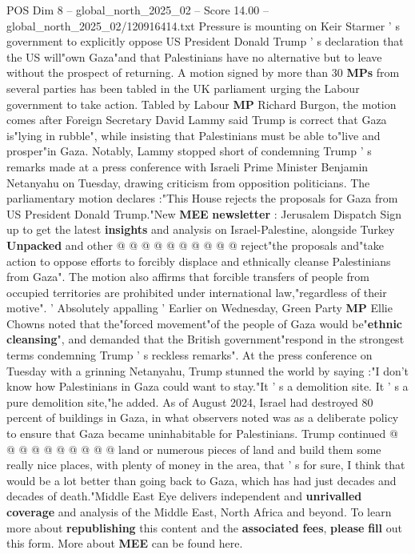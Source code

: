 \begin{textsample}{POS Dim 8 – global\_north\_2025\_02 – Score 14.00 – global\_north\_2025\_02/120916414.txt}  \label{ex:f8_pos_010}
Pressure is mounting on Keir Starmer ' s government to explicitly oppose US President Donald Trump ' s declaration that the US will"own Gaza"and that Palestinians have no alternative but to leave without the prospect of returning.
A motion signed by more than 30 \textbf{MPs} from several parties has been tabled in the UK parliament urging the Labour government to take action.
Tabled by Labour \textbf{MP} Richard Burgon, the motion comes after Foreign Secretary David Lammy said Trump is correct that Gaza is"lying in rubble", while insisting that Palestinians must be able to"live and prosper"in Gaza.
Notably, Lammy stopped short of condemning Trump ' s remarks made at a press conference with Israeli Prime Minister Benjamin Netanyahu on Tuesday, drawing criticism from opposition politicians.
The parliamentary motion declares :"This House rejects the proposals for Gaza from US President Donald Trump."New \textbf{MEE} \textbf{newsletter} : Jerusalem Dispatch Sign up to get the latest \textbf{insights} and analysis on Israel-Palestine, alongside Turkey \textbf{Unpacked} and other @ @ @ @ @ @ @ @ @ @ reject"the proposals and"take action to oppose efforts to forcibly displace and ethnically cleanse Palestinians from Gaza".
The motion also affirms that forcible transfers of people from occupied territories are prohibited under international law,"regardless of their motive". ' Absolutely appalling ' Earlier on Wednesday, Green Party \textbf{MP} Ellie Chowns noted that the"forced movement"of the people of Gaza would be"\textbf{ethnic} \textbf{cleansing}", and demanded that the British government"respond in the strongest terms condemning Trump ' s reckless remarks".
At the press conference on Tuesday with a grinning Netanyahu, Trump stunned the world by saying :"I don't know how Palestinians in Gaza could want to stay."It ' s a demolition site.
It ' s a pure demolition site,"he added.
As of August 2024, Israel had destroyed 80 percent of buildings in Gaza, in what observers noted was as a deliberate policy to ensure that Gaza became uninhabitable for Palestinians.
Trump continued @ @ @ @ @ @ @ @ @ @ land or numerous pieces of land and build them some really nice places, with plenty of money in the area, that ' s for sure, I think that would be a lot better than going back to Gaza, which has had just decades and decades of death."Middle East Eye delivers independent and \textbf{unrivalled} \textbf{coverage} and analysis of the Middle East, North Africa and beyond.
To learn more about \textbf{republishing} this content and the \textbf{associated} \textbf{fees}, \textbf{please} \textbf{fill} out this form.
More about \textbf{MEE} can be found here.

\end{textsample}
